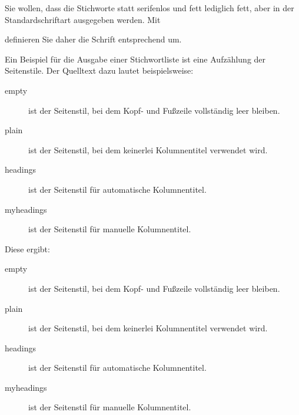     \begin{Example}
      Sie wollen, dass die Stichworte statt serifenlos und fett lediglich
      fett, aber in der Standardschriftart ausgegeben werden. Mit
\begin{lstcode}
\end{lstcode}
      definieren Sie daher die Schrift entsprechend um.

      Ein Beispiel für die Ausgabe einer Stichwortliste ist eine Aufzählung
      der Seitenstile. Der Quelltext dazu lautet beispielsweise:
\begin{lstcode}
  \begin{description}
    \item[empty] ist der Seitenstil, bei dem Kopf-
      und Fußzeile vollständig leer bleiben.
    \item[plain] ist der Seitenstil, bei dem
      keinerlei Kolumnentitel verwendet wird.
    \item[headings] ist der Seitenstil für
      automatische Kolumnentitel.
    \item[myheadings] ist der Seitenstil für
      manuelle Kolumnentitel.
  \end{description}
\end{lstcode}
      Diese ergibt:
      \begin{ShowOutput}
        \begin{description}
        \item[empty] ist der Seitenstil, bei dem Kopf- und
          Fußzeile vollständig leer bleiben.
        \item[plain] ist der Seitenstil, bei dem keinerlei
          Kolumnentitel verwendet wird.
        \item[headings] ist der Seitenstil für automatische
          Kolumnentitel.
        \item[myheadings] ist der Seitenstil für manuelle
          Kolumnentitel.
        \end{description}
      \end{ShowOutput}
    \end{Example}%
  \fi
  \EndIndexGroup%
\fi

